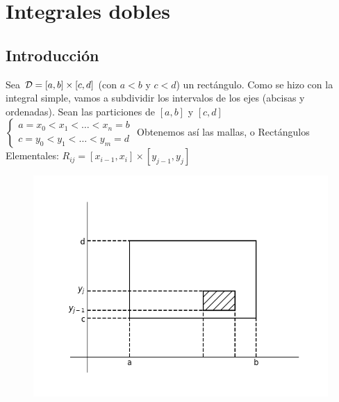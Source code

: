 \documentclass{report}
\begin{document}
\chapter{Integrales dobles}
  \section{Introducción}
    \noindent Sea $\mathcal{D}=\left[a,b\right]\times\left[c,d\right]$ (con $a<b$ y $c<d$)
    un rectángulo. Como se hizo con la integral simple, vamos a subdividir 
    los intervalos de los ejes (abcisas y ordenadas). Sean las particiones de
    $\left[a,b\right]$ y $\left[c,d\right]$\\ \setlength\extrarowheight{0pt}
    $\begin{cases}a=x_0<x_1<\hdots<x_n=b\\c=y_0<y_1<\hdots<y_m=d\end{cases}$ 
    Obtenemos así las mallas, o Rectángulos Elementales: 
    $R_{ij}=\left[x_{i-1},x_i\right]\times\left[y_{j-1},y_j\right]$
    \begin{figure}
      \hspace{-0.3cm}
      \includegraphics[width=.4\textwidth]{integralesdobles.png}
    \end{figure}
    \clearpage
\end{document}

